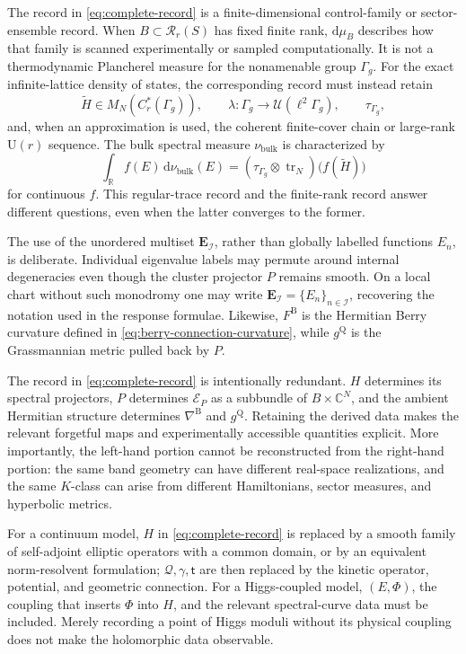 \documentclass[11pt]{article}
\theoremstyle{definition}
\theoremstyle{remark}
\newcommand{\CC}{\mathbb C}
\newcommand{\RR}{\mathbb R}
\newcommand{\UU}{\mathrm U}
\newcommand{\tr}{\operatorname{tr}}
\newcommand{\cR}{\mathcal R}
\newcommand{\dd}{\mathrm d}
\begin{document}
The record in \eqref{eq:complete-record} is a finite-dimensional
control-family or sector-ensemble record.  When
\(B\subset\cR_r(S)\) has fixed finite rank, \(\dd\mu_B\) describes how that
family is scanned experimentally or sampled computationally.  It is not a
thermodynamic Plancherel measure for the nonamenable group \(\Gamma_g\).  For
the exact infinite-lattice density of states, the corresponding record must
instead retain
\[
  \widetilde H\in M_N(C_r^*(\Gamma_g)),\qquad
  \lambda:\Gamma_g\to\mathcal U(\ell^2\Gamma_g),\qquad
  \tau_{\Gamma_g},
\]
and, when an approximation is used, the coherent finite-cover chain or
large-rank \(\UU(r)\) sequence.  The bulk spectral measure
\(\nu_{\mathrm{bulk}}\) is characterized by
\[
 \int_{\RR}f(E)\,\dd\nu_{\mathrm{bulk}}(E)
   =(\tau_{\Gamma_g}\otimes\tr_N)\bigl(f(\widetilde H)\bigr)
\]
for continuous \(f\).  This regular-trace record and the finite-rank record
answer different questions, even when the latter converges to the former.

The use of the unordered multiset
\(\boldsymbol E_{\mathcal I}\), rather than globally labelled functions
\(E_n\), is deliberate.  Individual eigenvalue labels may permute around
internal degeneracies even though the cluster projector \(P\) remains
smooth.  On a local chart without such monodromy one may write
\(\boldsymbol E_{\mathcal I}=\{E_n\}_{n\in\mathcal I}\), recovering the
notation used in the response formulae.  Likewise, \(F^{\mathrm B}\) is the
Hermitian Berry curvature defined in
\eqref{eq:berry-connection-curvature}, while \(g^{\mathrm Q}\) is the
Grassmannian metric pulled back by \(P\).

The record in \eqref{eq:complete-record} is intentionally redundant.
\(H\) determines its spectral projectors, \(P\) determines
\(\mathscr E_P\) as a subbundle of \(B\times\CC^N\), and the ambient
Hermitian structure determines \(\nabla^{\mathrm B}\) and
\(g^{\mathrm Q}\).  Retaining the derived data makes the relevant
forgetful maps and experimentally accessible quantities explicit.  More
importantly, the left-hand portion cannot be reconstructed from the
right-hand portion: the same band geometry can have different real-space
realizations, and the same \(K\)-class can arise from different Hamiltonians,
sector measures, and hyperbolic metrics.

For a continuum model, \(H\) in \eqref{eq:complete-record} is replaced by a
smooth family of self-adjoint elliptic operators with a common domain, or by
an equivalent norm-resolvent formulation; \(\mathcal Q,\gamma,\mathsf t\) are
then replaced by the kinetic operator, potential, and geometric connection.
For a Higgs-coupled model, \((E,\Phi)\), the coupling that inserts \(\Phi\)
into \(H\), and the relevant spectral-curve data must be included.  Merely
recording a point of Higgs moduli without its physical coupling does not make
the holomorphic data observable.
\end{document}
